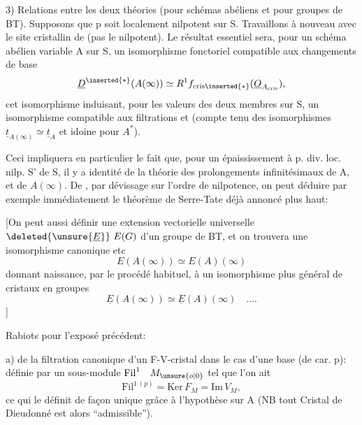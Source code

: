 3) Relations entre les deux théories (pour schémas abéliens et pour  groupes de BT). Supposons que p soit localement nilpotent sur S. Travaillons  à nouveau avec le site cristallin de  (pas le nilpotent). Le résultat essentiel sera, pour un schéma abélien variable A sur S, un isomorphisme fonctoriel compatible aux changements de base
\[
\underline{D}^{\inserted{*}}(A(\infty))\simeq R^{1}f_{\mathrm{cris}\inserted{*}}(\underline{O}_{A_{\mathrm{cris}}}),
\]
cet isomorphisme induisant, pour les valeurs des deux membres sur S, un isomorphisme compatible aux filtrations et (compte tenu des isomorphismes $\underline{t}_{A(\infty)}\simeq\underline{t}_A$ et idoine pour $A^{*}$).

Ceci impliquera en particulier le fait que, pour un  épaississement à p. div. loc. nilp.  S' de S, il y a identité de la théorie des prolongements infinitésimaux de A, et de $A(\infty)$. De , par dévissage sur l'ordre de nilpotence, on peut déduire par exemple immédiatement le théorème de Serre-Tate déjà annoncé plus haut:

[On peut aussi définir une extension vectorielle universelle $\deleted{\unsure{\underline{E}}}\ E(G)$ d'un groupe de BT, et on trouvera une isomorphisme canonique etc
\[
E(A(\infty))\simeq E(A)(\infty)
\]
donnant naissance, par le procédé habituel, à un isomorphisme plus général de cristaux en groupes
\[
\underline{E}(A(\infty))\simeq\underline{E}(A)(\infty)\quad ....
\]
]



Rabiots pour l'exposé précédent:

a)  de la filtration canonique d'un F-V-cristal dans le cas d'une base  (de car. p):  définie par un sous-module $\mathrm{Fil}^{1}\quad M_{\unsure{o|0}}$  tel que l'on ait
\[
\mathrm{Fil}^{1\,(p)}=\mathrm{Ker}\,F_M=\mathrm{Im}\,V_M,
\]
ce qui le définit de façon unique grâce à l'hypothèse sur A (NB tout Cristal de Dieudonné est alors ``admissible'').

